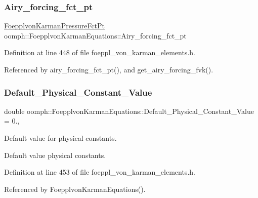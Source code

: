\subsubsection{\texorpdfstring{Airy\+\_\+forcing\+\_\+fct\+\_\+pt}{Airy\_forcing\_fct\_pt}}
{\footnotesize\ttfamily \hyperlink{classoomph_1_1FoepplvonKarmanEquations_a39b64f9712ec34f455beb9f4271ff297}{Foepplvon\+Karman\+Pressure\+Fct\+Pt} oomph\+::\+Foepplvon\+Karman\+Equations\+::\+Airy\+\_\+forcing\+\_\+fct\+\_\+pt\hspace{0.3cm}{\ttfamily [protected]}}



Definition at line 448 of file foeppl\+\_\+von\+\_\+karman\+\_\+elements.\+h.



Referenced by airy\+\_\+forcing\+\_\+fct\+\_\+pt(), and get\+\_\+airy\+\_\+forcing\+\_\+fvk().

\mbox{\label{classoomph_1_1FoepplvonKarmanEquations_ac7346e43c4830c13d1320773d6608def}} 
\subsubsection{\texorpdfstring{Default\+\_\+\+Physical\+\_\+\+Constant\+\_\+\+Value}{Default\_Physical\_Constant\_Value}}
{\footnotesize\ttfamily double oomph\+::\+Foepplvon\+Karman\+Equations\+::\+Default\+\_\+\+Physical\+\_\+\+Constant\+\_\+\+Value = 0.\hspace{0.3cm}{\ttfamily [static]}, {\ttfamily [private]}}



Default value for physical constants. 

Default value physical constants. 

Definition at line 453 of file foeppl\+\_\+von\+\_\+karman\+\_\+elements.\+h.



Referenced by Foepplvon\+Karman\+Equations().

\mbox{\label{classoomph_1_1FoepplvonKarmanEquations_a87b07cdd082aeda0e5c1d731328492bf}} 
